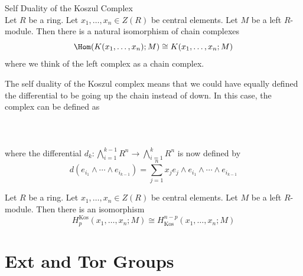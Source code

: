 \documentclass[a4paper]{article}
\begin{document}
\begin{thm}{Self Duality of the Koszul Complex}{}\\
Let $R$ be a ring. Let $x_1,\dots,x_n\in Z(R)$ be central elements. Let $M$ be a left $R$-module. Then there is a natural isomorphism of chain complexes $$\Hom(K(x_1,\dots,x_n);M)\cong K(x_1,\dots,x_n;M)$$ where we think of the left complex as a chain complex. 
\end{thm}

The self duality of the Koszul complex means that we could have equally defined the differential to be going up the chain instead of down. In this case, the complex can be defined as \\~\\
\\~\\
where the differential $d_k:\bigwedge_{i=1}^{k-1}R^n\to\bigwedge_{i=1}^kR^n$ is now defined by $$d(e_{i_1}\wedge\cdots\wedge e_{i_{k-1}})=\sum_{j=1}^nx_je_j\wedge e_{i_1}\wedge\cdots\wedge e_{i_{k-1}}$$

\begin{crl}{}{} Let $R$ be a ring. Let $x_1,\dots,x_n\in Z(R)$ be central elements. Let $M$ be a left $R$-module. Then there is an isomorphism $$H_p^\text{Kos}(x_1,\dots,x_n;M)\cong H_{\text{Kos}}^{n-p}(x_1,\dots,x_n;M)$$
\end{crl}

\pagebreak
\section{Ext and Tor Groups}
\end{document}
